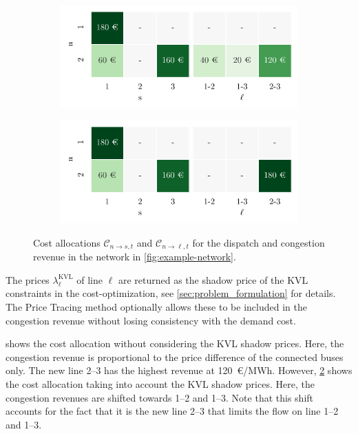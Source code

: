 \documentclass[11pt,twocolumn]{article}
\newcommand{\cost}{\mathcal{C}}
\newcommand{\allocategeneratorcost}[1][n \rightarrow s]{\cost_{#1, t}}
\newcommand{\allocatelinecost}[1][n \rightarrow \ell]{\cost_{#1, t}}
\begin{document}
\begin{figure}[h!]
    \begin{subfigure}[c]{\linewidth}
        \includegraphics[width=\linewidth]{example-with-cycles/payoff}
        \label{fig:example-network-payoff}
    \end{subfigure}
    \begin{subfigure}[c]{\linewidth}
        \includegraphics[width=\linewidth]{example-with-cycles/payoff-kvl}
        \label{fig:example-network-payoff-kvl}
    \end{subfigure}
    \caption{Cost allocations $\allocategeneratorcost$ and $\allocatelinecost$ for the dispatch and congestion revenue in the network in \cref{fig:example-network}.}
    \label{fig:example-network-payoff-all}
\end{figure}

The prices $\lambda_\ell^\text{KVL}$ of line $\ell$ are returned as the shadow price of the \ac{KVL} constraints in the cost-optimization, see \cref{sec:problem_formulation} for details. The Price Tracing method optionally allows these to be included in the congestion revenue without losing consistency with the demand cost.



 shows the cost allocation without considering the \ac{KVL} shadow prices. Here, the congestion revenue is proportional to the price difference of the connected buses only. The new line 2--3 has the highest revenue at 120~\euro/MWh. However, \cref{fig:example-network-payoff-kvl} shows the cost allocation taking into account the \ac{KVL} shadow prices. Here, the congestion revenues are shifted towards 1--2 and 1--3. Note that this shift accounts for the fact that it is the new line 2--3 that limits the flow on line 1--2 and 1--3.
\end{document}
